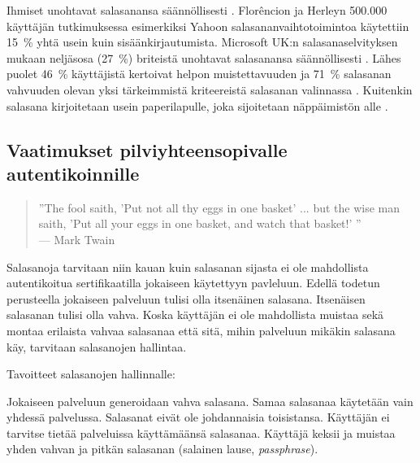\documentclass{tktltiki}
\begin{document}
Ihmiset unohtavat salasanansa säännöllisesti \cite{ponemon_pw_survey_06}. Florêncion ja Herleyn 500.000 käyttäjän tutkimuksessa \cite{study_of_passwords_07} esimerkiksi Yahoon salasananvaihtotoimintoa käytettiin 15~\% yhtä usein kuin sisäänkirjautumista. Microsoft UK:n salasanaselvityksen mukaan neljäsosa (27~\%) briteistä unohtavat salasanansa säännöllisesti \cite{microsoft_pw_survey_04}. Lähes puolet 46~\% käyttäjistä kertoivat helpon muistettavuuden ja 71~\% salasanan vahvuuden olevan yksi tärkeimmistä kriteereistä salasanan valinnassa \cite{symantec_pw_survey_10}. Kuitenkin salasana kirjoitetaan usein paperilapulle, joka sijoitetaan näppäimistön alle \cite{pw_auth_system_perspective_08}.



\subsection{Vaatimukset pilviyhteensopivalle autentikoinnille}

  \begin{quote}
      ''The fool saith, 'Put not all thy eggs in one basket' ... 
      but the wise man saith, 'Put all your eggs in one basket, and watch that basket!' ''
      \\--- Mark Twain \cite{twain_eggs_1894}
  \end {quote}

Salasanoja tarvitaan niin kauan kuin salasanan sijasta ei ole mahdollista autentikoitua sertifikaatilla jokaiseen käytettyyn pavleluun. Edellä todetun perusteella jokaiseen palveluun tulisi olla itsenäinen salasana. Itsenäisen salasanan tulisi olla vahva. Koska käyttäjän ei ole mahdollista muistaa sekä montaa erilaista vahvaa salasanaa että sitä, mihin palveluun mikäkin salasana käy, tarvitaan salasanojen hallintaa.



Tavoitteet salasanojen hallinnalle:

Jokaiseen palveluun generoidaan vahva salasana.
Samaa salasanaa käytetään vain yhdessä palvelussa.
Salasanat eivät ole johdannaisia toisistansa.
Käyttäjän ei tarvitse tietää palveluissa käyttämäänsä salasanaa.
Käyttäjä keksii ja muistaa yhden vahvan ja pitkän salasanan (salainen lause, \emph{passphrase}).
\end{document}
